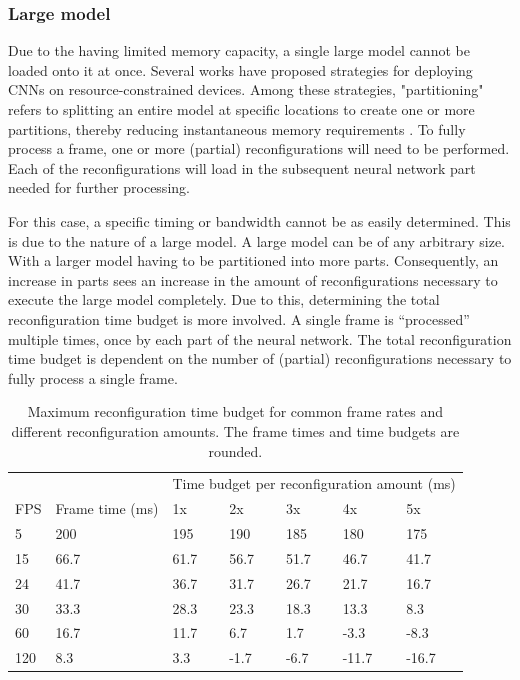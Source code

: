 \subsubsection{Large model}

Due to the \graicore{} having limited memory capacity, a single large model cannot be loaded onto it at once.
Several works have proposed strategies for deploying CNNs on resource-constrained devices.
Among these strategies, "partitioning" refers to splitting an entire model at specific locations to create one or more partitions, thereby reducing instantaneous memory requirements \cite{kaboubiHybridPartitioningEmbedded2023}.
To fully process a frame, one or more (partial) reconfigurations will need to be performed.
Each of the reconfigurations will load in the subsequent neural network part needed for further processing.

For this case, a specific timing or bandwidth cannot be as easily determined.
This is due to the nature of a large model. A large model can be of any arbitrary size.
With a larger model having to be partitioned into more parts.
Consequently, an increase in parts sees an increase in the amount of reconfigurations necessary to execute the large model completely.
Due to this, determining the total reconfiguration time budget is more involved.
A single frame is ``processed'' multiple times, once by each part of the neural network.
The total reconfiguration time budget is dependent on the number of (partial) reconfigurations necessary to fully process a single frame.

\begin{table}[hbtp]
\centering
\begin{tabular}{@{}lllllll@{}}
\toprule
    &            & \multicolumn{5}{l}{Time budget per reconfiguration amount (ms)} \\
FPS & Frame time (ms) & 1x         & 2x          & 3x         & 4x         & 5x         \\ \midrule
5   & 200  & 195  & 190  & 185  & 180   & 175   \\
15  & 66.7 & 61.7 & 56.7 & 51.7 & 46.7  & 41.7  \\
24  & 41.7 & 36.7 & 31.7 & 26.7 & 21.7  & 16.7  \\
30  & 33.3 & 28.3 & 23.3 & 18.3 & 13.3  & 8.3   \\
60  & 16.7 & 11.7 & 6.7  & 1.7  & -3.3  & -8.3  \\
120 & 8.3  & 3.3  & -1.7 & -6.7 & -11.7 & -16.7 \\ \bottomrule
\end{tabular}
\caption{Maximum reconfiguration time budget for common frame rates and different reconfiguration amounts. The frame times and time budgets are rounded.}
\label{tab:common_fps_reconfig_amount}
\end{table}

